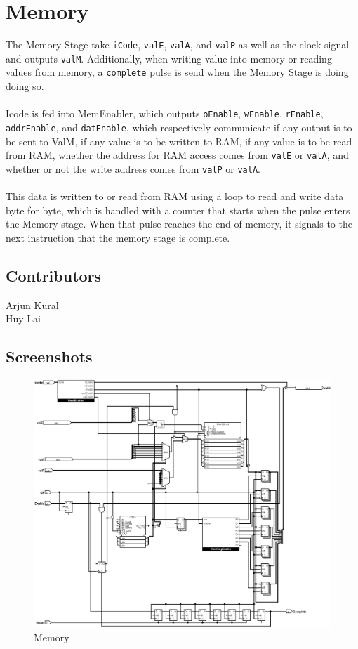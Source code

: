 \clearpage
\section*{Memory}
The Memory Stage take \verb+iCode+, \verb+valE+, \verb+valA+, and \verb+valP+ as well as the clock signal and outputs \verb+valM+. Additionally, when writing value into memory or reading values from memory, a \verb+complete+ pulse is send when the Memory Stage is doing doing so.\\\\
Icode is fed into MemEnabler, which outputs \verb+oEnable+, \verb+wEnable+, \verb+rEnable+, \verb+addrEnable+, and \verb+datEnable+, which respectively communicate if any output is to be sent to ValM, if any value is to be written to RAM, if any value is to be read from RAM, whether the address for RAM access comes from \verb+valE+ or \verb+valA+, and whether or not the write address comes from \verb+valP+ or \verb+valA+.
\\\\
This data is written to or read from RAM using a loop to read and write data byte for byte, which is handled with a counter that starts when the pulse enters the Memory stage.  When that pulse reaches the end of memory, it signals to the next instruction that the memory stage is complete.
\subsection*{Contributors}
Arjun Kural\\
Huy Lai
\clearpage
\subsection*{Screenshots}

\begin{figure}[!ht]
    \centering
    \includegraphics[width=\textwidth]{Images/Memory.png}
    \caption{Memory}
\end{figure}